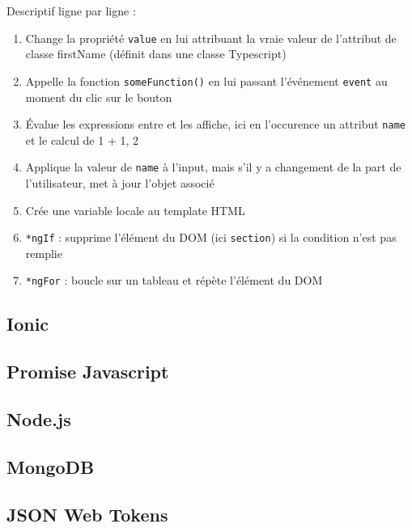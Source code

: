 \documentclass[a4paper, 12pt]{article}
\begin{document}
Descriptif ligne par ligne :
\begin{enumerate}
    \item Change la propriété \texttt{value} en lui attribuant la vraie valeur de l'attribut de classe firstName (définit dans une classe Typescript)
    \item Appelle la fonction \texttt{someFunction()} en lui passant l'événement \texttt{event} au moment du clic sur le bouton
    \item Évalue les expressions entre {} et les affiche, ici en l'occurence un attribut \texttt{name} et le calcul de 1 + 1, 2
    \item Applique la valeur de \texttt{name} à l'input, mais s'il y a changement de la part de l'utilisateur, met à jour l'objet associé
    \item Crée une variable locale au template HTML
    \item \texttt{*ngIf} : supprime l'élément du DOM (ici \texttt{section}) si la condition n'est pas remplie
    \item \texttt{*ngFor} : boucle sur un tableau et répète l'élément du DOM
\end{enumerate}
\subsection{Ionic}
\subsection{Promise Javascript}
\subsection{Node.js}
\subsection{MongoDB}
\subsection{JSON Web Tokens}
\end{document}
